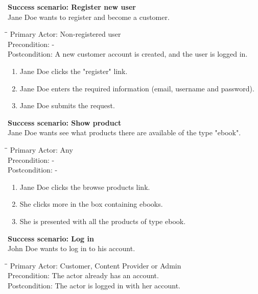 \textbf{Success scenario: Register new user} \\
Jane Doe wants to register and become a customer. 
\begin{tabbing}
\hspace{5mm}\=\hspace{28mm}\=\kill
\>Primary Actor:\> Non-registered user\\
\>Precondition:\> -\\
\>Postcondition:\> A new customer account is created, and the user is logged in.
\end{tabbing}
\begin{enumerate} \setlength{\itemsep}{-1mm}
	\item Jane Doe clicks the "register" link.
	\item Jane Doe enters the required information (email, username and password).
	\item Jane Doe submits the request.
\end{enumerate}
\vspace{3mm}
\textbf{Success scenario: Show product} \\
Jane Doe wants see what products there are available of the type "ebook".
\begin{tabbing}
\hspace{5mm}\=\hspace{26mm}\=\kill
\>Primary Actor:\> Any\\
\>Precondition:\> -\\
\>Postcondition:\> -
\end{tabbing}
\begin{enumerate} \setlength{\itemsep}{-1mm}
	\item Jane Doe clicks the browse products link.
	\item She clicks more in the box containing ebooks.
	\item She is presented with all the products of type ebook.
\end{enumerate}
\vspace{3mm}
\textbf{Success scenario: Log in} \\
John Doe wants to log in to his account. 
\begin{tabbing}
\hspace{5mm}\=\hspace{26mm}\=\kill
\>Primary Actor:\> Customer, Content Provider or Admin\\
\>Precondition:\> The actor already has an account.\\
\>Postcondition:\> The actor is logged in with her account.
\end{tabbing}
